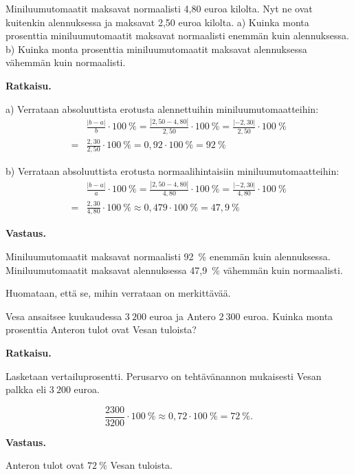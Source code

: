 \begin{esimerkki}
    Miniluumutomaatit maksavat normaalisti 4,80 euroa kilolta. Nyt ne ovat kuitenkin alennuksessa ja maksavat 2,50 euroa kilolta.
     \newline a) Kuinka monta prosenttia miniluumutomaatit maksavat normaalisti enemmän kuin alennuksessa.
     \newline b) Kuinka monta prosenttia miniluumutomaatit maksavat alennuksessa vähemmän kuin normaalisti.
     
     \textbf{Ratkaisu.}
     
a) Verrataan absoluuttista erotusta alennettuihin miniluumutomaatteihin:
\begin{align*}
     &\frac{|b-a|}{b} \cdot 100~\% = \frac{|2,50-4,80|}{2,50} \cdot 100~\% = \frac{|-2,30|}{2,50} \cdot 100~\% \\
     = &\frac{2,30}{2,50} \cdot 100~\% = 0,92 \cdot 100~\% = 92~\%
\end{align*}
    
    
b) Verrataan absoluuttista erotusta normaalihintaisiin miniluumutomaatteihin:
\begin{align*}
     &\frac{|b-a|}{a} \cdot 100~\% = \frac{|2,50-4,80|}{4,80} \cdot 100~\% = \frac{|-2,30|}{4,80} \cdot 100~\% \\
     = &\frac{2,30}{4,80} \cdot 100~\% \approx 0,479 \cdot 100~\% = 47,9~\%
\end{align*}

     \textbf{Vastaus.}
     
     Miniluumutomaatit maksavat normaalisti 92~\% enemmän kuin alennuksessa.
     Miniluumutomaatit maksavat alennuksessa 47,9~\% vähemmän kuin normaalisti.
     
     Huomataan, että se, mihin verrataan on merkittävää.
     \end{esimerkki}
    

\begin{esimerkki}
    Vesa ansaitsee kuukaudessa ${3~200}$ euroa ja Antero ${2~300}$ euroa.
    Kuinka monta prosenttia Anteron tulot ovat Vesan tuloista? 
    
    \textbf{Ratkaisu.}
    
    Lasketaan vertailuprosentti. Perusarvo on tehtävänannon mukaisesti
    Vesan palkka eli ${3~200}$ euroa.
    
    \[
        \frac{2300}{3200} \cdot 100~\%
        \approx 0,72\cdot 100~\%
        = 72~\%.
    \]
    
    \textbf{Vastaus.}
    
    Anteron tulot ovat $72~\%$ Vesan tuloista.
\end{esimerkki}

